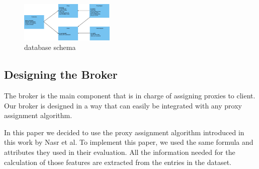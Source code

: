 \documentclass[conference]{IEEEtran}
\begin{document}
\begin{figure}[h]
    \centering
    \includegraphics[width=0.4\textwidth]{schema.jpeg}
    \caption{database schema}
    \label{fig:schema}
\end{figure}

\subsection{Designing the Broker}
The broker is the main component that is in charge of assigning proxies to client. Our broker is designed in a way that can easily be integrated with any proxy assignment algorithm.

In this paper we decided to use the proxy assignment algorithm introduced in this \cite{nasr2019enemy} work by Nasr et al. To implement this paper, we used the same formula and attributes they used in their evaluation. All the information needed for the calculation of those features are extracted from the entries in the dataset.

\printbibliography
\end{document}
